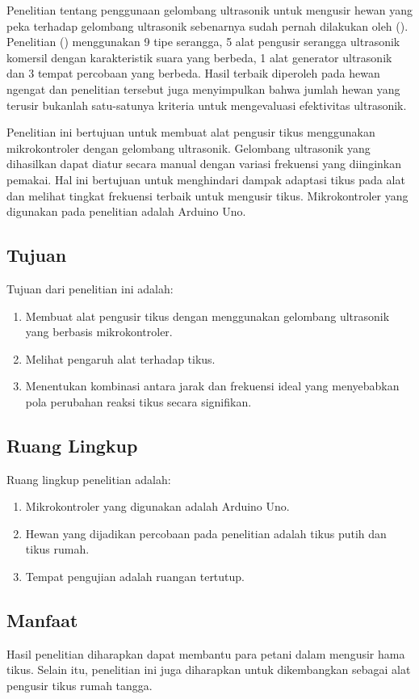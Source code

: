 Penelitian tentang penggunaan gelombang ultrasonik untuk mengusir hewan yang peka terhadap gelombang ultrasonik sebenarnya sudah pernah dilakukan oleh \citeauthor{BHADRIRAJU2001} (\cite*{BHADRIRAJU2001}). Penelitian \citeauthor{BHADRIRAJU2001} (\cite*{BHADRIRAJU2001}) menggunakan 9 tipe serangga, 5 alat pengusir serangga ultrasonik komersil dengan karakteristik suara yang berbeda, 1 alat generator ultrasonik dan 3 tempat percobaan yang berbeda. Hasil terbaik diperoleh pada hewan ngengat dan penelitian tersebut juga menyimpulkan bahwa jumlah hewan yang terusir bukanlah satu-satunya kriteria untuk mengevaluasi efektivitas ultrasonik.

Penelitian ini bertujuan untuk membuat alat pengusir tikus menggunakan mikrokontroler dengan gelombang ultrasonik. Gelombang ultrasonik yang dihasilkan dapat diatur secara manual dengan variasi frekuensi yang diinginkan pemakai. Hal ini bertujuan untuk menghindari dampak adaptasi tikus pada alat dan melihat tingkat frekuensi terbaik untuk mengusir tikus. Mikrokontroler yang digunakan pada penelitian adalah Arduino Uno.

\subsection*{Tujuan}
Tujuan dari penelitian ini adalah:
\begin{enumerate}[noitemsep] 
\item Membuat alat pengusir tikus dengan menggunakan gelombang ultrasonik yang berbasis mikrokontroler.
\item Melihat pengaruh alat terhadap tikus.
\item Menentukan kombinasi antara jarak dan frekuensi ideal yang menyebabkan pola perubahan reaksi tikus secara signifikan.
\end{enumerate}

\subsection*{Ruang Lingkup}
Ruang lingkup penelitian adalah:
\begin{enumerate}[noitemsep] 
\item Mikrokontroler yang digunakan adalah Arduino Uno.
\item Hewan yang dijadikan percobaan pada penelitian adalah tikus putih dan tikus rumah. 
\item Tempat pengujian adalah ruangan tertutup.
\end{enumerate}

\subsection*{Manfaat}
Hasil penelitian diharapkan dapat membantu para petani dalam mengusir hama tikus. Selain itu, penelitian ini juga diharapkan untuk dikembangkan sebagai alat pengusir tikus rumah tangga.
